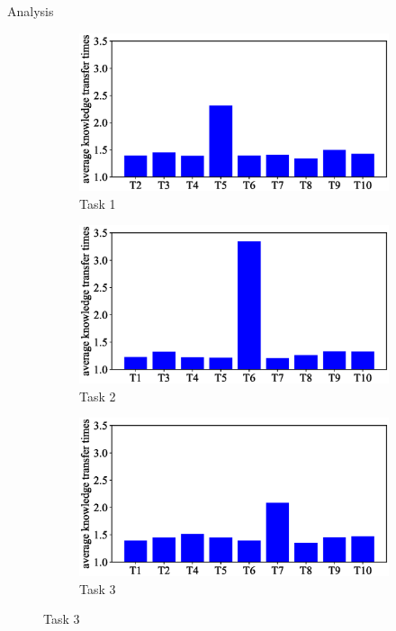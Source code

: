 \begin{frame}{Analysis}
    \begin{figure}
        \begin{subfigure}[b]{0.27\linewidth}
            \includegraphics[width=\textwidth]{figure/count/1.eps}
            \caption{Task 1}
        \end{subfigure}
        \begin{subfigure}[b]{0.27\linewidth}
            \includegraphics[width=\textwidth]{figure/count/2.eps}
            \caption{Task 2}
        \end{subfigure}
        \begin{subfigure}[b]{0.27\linewidth}
            \includegraphics[width=\textwidth]{figure/count/3.eps}
            \caption{Task 3}
        \end{subfigure}


\end{figure}
\end{frame}
